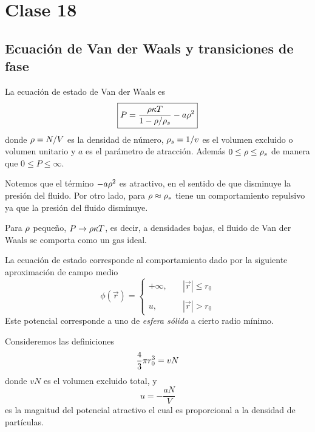 \section{Clase 18}
\subsection{Ecuación de Van der Waals y transiciones de fase}
La ecuación de estado de Van der Waals es
\begin{equation}
\boxed{  P=\frac{\rho\kappa T}{1-\rho/\rho_s}-a\rho^2}
\end{equation}
donde $\rho=N/V$ es la densidad de número, $\rho_s=1/v$ es el volumen excluido o volumen unitario y $a$ es el parámetro de atracción. Además $0\leq\rho\leq\rho_s$ de manera que $0\leq P\leq \infty$.

Notemos que el término $-a\rho^2$ es atractivo, en el sentido de que disminuye la presión del fluido. Por otro lado, para $\rho\approx\rho_s$ tiene un comportamiento repulsivo ya que la presión del fluido disminuye.

Para $\rho$ pequeño, $P\to \rho\kappa T$, es decir, a densidades bajas, el fluido de Van der Waals se comporta como un gas ideal.

La ecuación de estado corresponde al comportamiento dado por la siguiente aproximación de campo medio
\begin{equation}
  \phi(\vec{r})=\left\{\begin{array}{cc}
  	+\infty,&\quad |\vec{r}|\leq r_0 \\\\
  	u,&\quad |\vec{r}|> r_0 
  \end{array}\right.
\end{equation}
Este potencial corresponde a uno de \textit{esfera sólida} a cierto radio mínimo.

Consideremos las definiciones
\begin{equation}\label{18.volexc}
  \frac{4}{3}\pi r_0^3=vN
\end{equation}
donde $vN$ es el volumen excluido total, y
\begin{equation}
  u=-\frac{aN}{V}
\end{equation}
es la magnitud del potencial atractivo el cual es proporcional a la densidad de partículas.

